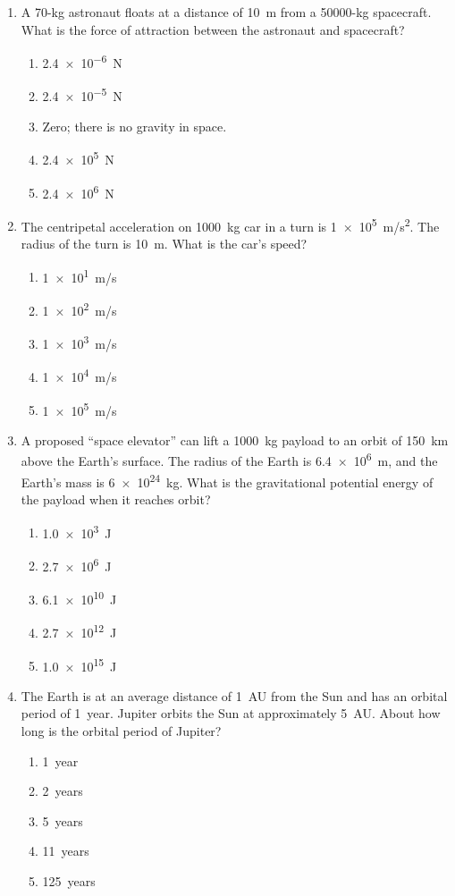 \documentclass{../../oss-apphys}
\begin{document}
\begin{multicols}{2}
\begin{enumerate}[leftmargin=18pt]
    \columnbreak
    
  \item A 70-\si{kg} astronaut floats at a distance of \SI{10}{\m} from a
    50000-\si{\kg} spacecraft. What is the force of attraction between the
    astronaut and spacecraft?
    \begin{enumerate}[noitemsep,topsep=0pt,leftmargin=18pt]
    \item\SI{2.4e-6}{N}
    \item\SI{2.4e-5}{N}
    \item Zero; there is no gravity in space.
    \item\SI{2.4e5}{N}
    \item\SI{2.4e6}{N}
    \end{enumerate}
    
  \item The centripetal acceleration on \SI{1000}{kg} car in a turn is
    \SI{1e5}{m/s^2}. The radius of the turn is \SI{10}{m}. What is the car's
    speed?
    \begin{enumerate}[noitemsep,topsep=0pt,leftmargin=18pt]
    \item\SI{1e1}{m/s}
    \item\SI{1e2}{m/s}
    \item\SI{1e3}{m/s}
    \item\SI{1e4}{m/s}
    \item\SI{1e5}{m/s}
    \end{enumerate}
  
  \item A proposed ``space elevator'' can lift a \SI{1000}{\kg} payload to an
    orbit of \SI{150}{\km} above the Earth's surface. The radius of the Earth is
    \SI{6.4e6}{\m}, and the Earth's mass is \SI{6e24}{\kg}. What is the
    gravitational potential energy of the payload when it reaches orbit?
    \begin{enumerate}[noitemsep,topsep=0pt,leftmargin=18pt]
    \item\SI{1.0e3}{J}
    \item\SI{2.7e6}{J}
    \item\SI{6.1e10}{J}
    \item\SI{2.7e12}{J}
    \item\SI{1.0e15}{J}
    \end{enumerate}

  \item The Earth is at an average distance of \SI{1}{AU} from the Sun and has
    an orbital period of \SI{1}{year}. Jupiter orbits the Sun at approximately
    \SI{5}{AU}. About how long is the orbital period of Jupiter?
    \begin{enumerate}[noitemsep,topsep=0pt,leftmargin=18pt]
    \item\SI{1}{year}
    \item\SI{2}{years}
    \item\SI{5}{years}
    \item\SI{11}{years}
    \item\SI{125}{years}
    \end{enumerate}
  

\end{enumerate}
\end{multicols}
\end{document}
